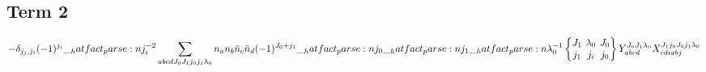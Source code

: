 \documentclass{scrartcl}
\newcommand{\sixj}[6]{\begingroup\setlength{\arraycolsep}{0.2em}\begin{Bmatrix} #1 & #2 & #3 \\ #4 & #5 & #6 \end{Bmatrix}\endgroup}
\begin{document}
\subsection{Term 2}
\begin{dmath*}
-\delta_{{j}_{j},{j}_{i}} \* (-1)^{{j}_{i}} \* \hatfact{{j}_{i}^{-2}} \* \sum_{a b c d {J}_{0} {J}_{1} {j}_{0} {j}_{1} {{\lambda}}_{0}} \* n_{a} \* n_{b} \* \bar{n}_{c} \* \bar{n}_{d} \* (-1)^{{J}_{0}+{j}_{1}} \* \hatfact{{j}_{0}} \* \hatfact{{j}_{1}} \* \hatfact{{{\lambda}}_{0}^{-1}} \* \sixj{{J}_{1}}{{{\lambda}}_{0}}{{J}_{0}}{{j}_{1}}{{j}_{i}}{{j}_{0}} \* Y_{a b c d}^{{J}_{0} {J}_{1} {{\lambda}}_{0}} \* X_{c d i a b j}^{{J}_{1} {j}_{0} {J}_{0} {j}_{1} {{\lambda}}_{0}}
\end{dmath*}
\end{document}

